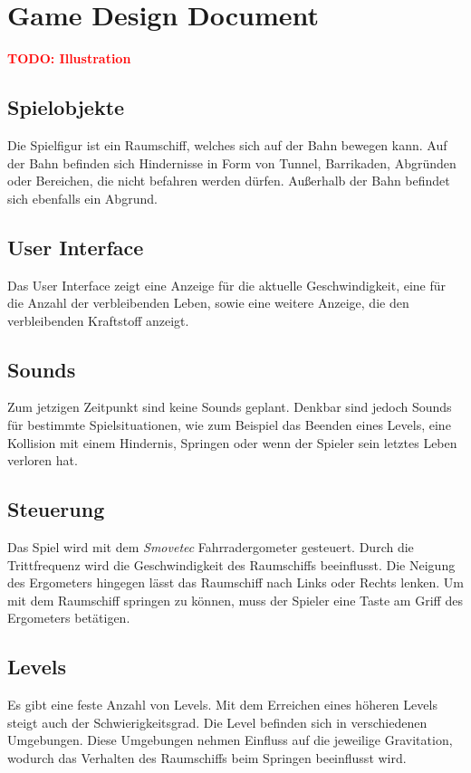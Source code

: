 \section{Game Design Document}

\textcolor{red}{\textbf{TODO: Illustration}}

\subsection{Spielobjekte}
Die Spielfigur ist ein Raumschiff, welches sich auf der Bahn bewegen kann. Auf der Bahn befinden sich Hindernisse in Form von Tunnel, Barrikaden, Abgründen oder Bereichen, die nicht befahren werden dürfen. Außerhalb der Bahn befindet sich ebenfalls ein Abgrund.

\subsection{User Interface}
Das User Interface zeigt eine Anzeige für die aktuelle Geschwindigkeit, eine für die Anzahl der verbleibenden Leben, sowie eine weitere Anzeige, die den verbleibenden Kraftstoff anzeigt.

\subsection{Sounds}
Zum jetzigen Zeitpunkt sind keine Sounds geplant. Denkbar sind jedoch Sounds für bestimmte Spielsituationen, wie zum Beispiel das Beenden eines Levels, eine Kollision mit einem Hindernis, Springen oder wenn der Spieler sein letztes Leben verloren hat.

\subsection{Steuerung}
Das Spiel wird mit dem \textit{Smovetec} Fahrradergometer gesteuert. Durch die Trittfrequenz wird die Geschwindigkeit des Raumschiffs beeinflusst. Die Neigung des Ergometers hingegen lässt das Raumschiff nach Links oder Rechts lenken. Um mit dem Raumschiff springen zu können, muss der Spieler eine Taste am Griff des Ergometers betätigen.

\subsection{Levels}
Es gibt eine feste Anzahl von Levels. Mit dem Erreichen eines höheren Levels steigt auch der Schwierigkeitsgrad. Die Level befinden sich in verschiedenen Umgebungen. Diese Umgebungen nehmen Einfluss auf die jeweilige Gravitation, wodurch das Verhalten des Raumschiffs beim Springen beeinflusst wird.